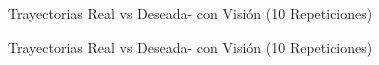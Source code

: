 {\begin{itemize}
\begin{figure}
	\centering
	\caption{Trayectorias Real vs Deseada- con Visión (10 Repeticiones)}
	\label{fig:errs_10reps_forward}
\end{figure}


\begin{figure}
	\centering
	\caption{Trayectorias Real vs Deseada- con Visión (10 Repeticiones)}
	\label{fig:errs_10reps_backward}
\end{figure}


\end{itemize} \par

}























